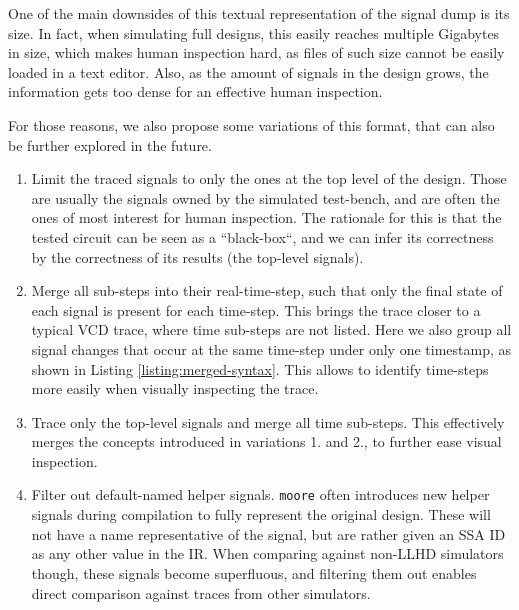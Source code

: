 One of the main downsides of this textual representation of the signal dump is its size. In fact, when simulating full designs, this easily reaches multiple Gigabytes in size, which makes human inspection hard, as files of such size cannot be easily loaded in a text editor. Also, as the amount of signals in the design grows, the information gets too dense for an effective human inspection.

For those reasons, we also propose some variations of this format, that can also be further explored in the future.

\begin{enumerate}
    \item Limit the traced signals to only the ones at the top level of the design. Those are usually the signals owned by the simulated test-bench, and are often the ones of most interest for human inspection. The rationale for this is that the tested circuit can be seen as a “black-box“, and we can infer its correctness by the correctness of its results (the top-level signals).
    \item Merge all sub-steps into their real-time-step, such that only the final state of each signal is present for each time-step. This brings the trace closer to a typical VCD trace, where time sub-steps are not listed. Here we also group all signal changes that occur at the same time-step under only one timestamp, as shown in Listing \ref{listing:merged-syntax}. This allows to identify time-steps more easily when visually inspecting the trace.
    \item Trace only the top-level signals and merge all time sub-steps. This effectively merges the concepts introduced in variations 1. and 2., to further ease visual inspection.
    \item Filter out default-named helper signals. \texttt{moore} often introduces new helper signals during compilation to fully represent the original design. These will not have a name representative of the signal, but are rather given an SSA ID as any other value in the IR. When comparing against non-LLHD simulators though, these signals become superfluous, and filtering them out enables direct comparison against traces from other simulators.
\end{enumerate}


